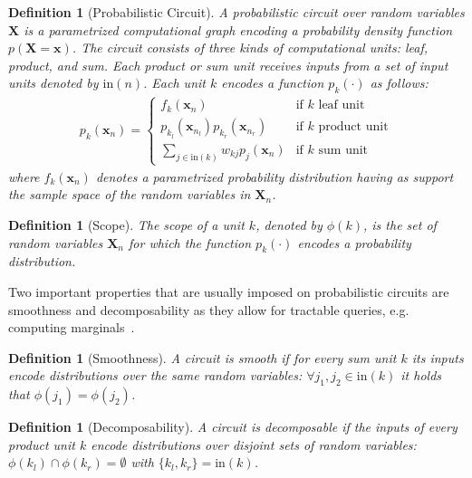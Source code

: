 \documentclass[letterpaper]{article} %
\newcommand{\eg}{e.g.\xspace}
\newtheorem{definition}[theorem]{Definition}
\newcommand{\circuit}{\ensuremath{p}}
\newcommand{\inputs}{\ensuremath{\text{in}}}
\newcommand{\Xvars}{\ensuremath{\mathbf{X}}}
\newcommand{\xvars}{\ensuremath{\mathbf{x}}}
\newcommand{\weight}{\ensuremath{w}}
\newcommand{\scope}{\ensuremath{\phi}}
\begin{document}
\begin{definition}[Probabilistic Circuit]
    \label{def:circuit}
    A probabilistic circuit over random variables $\Xvars$ is a parametrized computational graph encoding a probability density function $\circuit(\Xvars{=}\xvars)$.
    The circuit consists of three kinds of computational units:
    \textit{leaf}, \textit{product}, and \textit{sum}.
    Each product or sum unit receives inputs from a set of input units denoted by $\inputs(n)$.
    Each unit $k$ encodes a function $\circuit_{k}(\cdot)$ as follows:
    \begin{align*}
        {\circuit}_k(\xvars_n)=
        \begin{cases}
            f_k({\xvars_n})                                             & \text{if $k$ leaf unit}    \\
            \circuit_{k_l}(\xvars_{n_l})  \circuit_{k_r} (\xvars_{n_r}) & \text{if $k$ product unit} \\
            \sum_{j\in\inputs(k)} \weight_{kj} \circuit_j(\xvars_n)     & \text{if $k$ sum unit}
        \end{cases}
    \end{align*}
    where $f_k(\xvars_n)$  denotes a parametrized probability distribution having as support the sample space of the random variables in $\Xvars_n$.
\end{definition}



\begin{definition}[Scope]
    \label{def:scope:cond}
    The scope of a unit $k$, denoted by $\scope(k)$, is the set of random variables $\Xvars_n$ for which the function $\circuit_k (\cdot)$ encodes a probability distribution.
\end{definition}

Two important properties that are usually imposed on probabilistic circuits are smoothness and decomposability as they allow for tractable queries, \eg computing marginals~\citep{darwiche2001decomposable,darwiche2003differential}.
\begin{definition}[Smoothness]
    A circuit is smooth if for every sum unit $k$ its inputs encode distributions over the same random variables:
    $\forall j_1, j_2 {\in} \inputs(k)$ it holds that $\scope(j_1){=}\scope(j_2) $.
\end{definition}

\begin{definition}[Decomposability]
    A circuit is decomposable if the inputs of every product unit
    $k$ encode distributions over disjoint sets of random variables:
    $\scope (k_l) \cap \scope (k_r) = \emptyset$ with $\{k_l, k_r\}= \inputs (k)$.
\end{definition}
\end{document}
